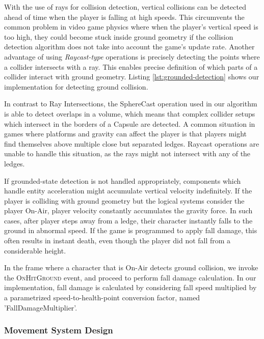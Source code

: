With the use of rays for collision detection, vertical collisions can be detected ahead of time when the player is falling at high speeds. This circumvents the common problem in video game physics where when the player's vertical speed is too high, they could become stuck inside ground geometry if the collision detection algorithm does not take into account the game's update rate. Another advantage of using \emph{Raycast-type} operations is precisely detecting the points where a collider intersects with a ray. This enables precise definition of which parts of a collider interact with ground geometry. Listing \ref{lst:grounded-detection} shows our implementation for detecting ground collision. %


\label{lst:ground-detection}

 In contrast to Ray Intersections, the SphereCast operation used in our algorithm is able to detect overlaps in a volume, which means that complex collider setups which intersect in the borders of a Capsule are detected. A common situation in games where platforms and gravity can affect the player is that players might find themselves above multiple close but separated ledges. Raycast operations are unable to handle this situation, as the rays might not intersect with any of the ledges.


If grounded-state detection is not handled appropriately, components which handle entity acceleration might accumulate vertical velocity indefinitely. If the player is colliding with ground geometry but the logical systems consider the player On-Air, player velocity constantly accumulates the gravity force. In such cases, after player steps away from a ledge, their character instantly falls to the ground in abnormal speed. If the game is programmed to apply fall damage, this often results in instant death, even though the player did not fall from a considerable height.

In the frame where a character that is On-Air detects ground collision, we invoke the \textsc{OnHitGround} event, and proceed to perform fall damage calculation. In our implementation, fall damage is calculated by considering fall speed multiplied by a parametrized speed-to-health-point conversion factor, named 'FallDamageMultiplier'.

\subsubsection{Movement System Design}

